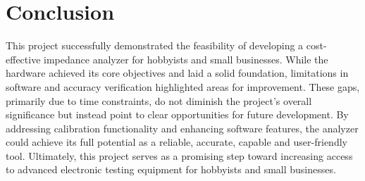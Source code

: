 \chapter{Conclusion} \label{ch:Conclusion}
This project successfully demonstrated the feasibility of developing a cost-effective impedance analyzer for hobbyists and small businesses. While the hardware achieved its core objectives and laid a solid foundation, limitations in software and accuracy verification highlighted areas for improvement. These gaps, primarily due to time constraints, do not diminish the project's overall significance but instead point to clear opportunities for future development. By addressing calibration functionality and enhancing software features, the analyzer could achieve its full potential as a reliable, accurate, capable and user-friendly tool. Ultimately, this project serves as a promising step toward increasing access to advanced electronic testing equipment for hobbyists and small businesses.